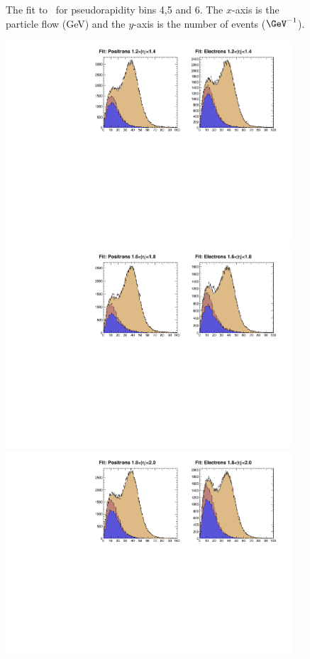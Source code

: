\begin{figure}
\begin{center}
\caption{  \label{fig:data2} The fit to \MET\ for pseudorapidity bins 4,5 and
6.  The $x$-axis is the particle flow \ETm (GeV) and the $y$-axis is the number
of events ($\GeV^{-1}$).}
\end{center}
\end{figure}

\begin{figure}
\begin{center}
\includegraphics[width=0.95\textwidth]{data_6.pdf} \\
\includegraphics[width=0.95\textwidth]{data_7.pdf} \\
\includegraphics[width=0.95\textwidth]{data_8.pdf}

\end{center}
\end{figure}
